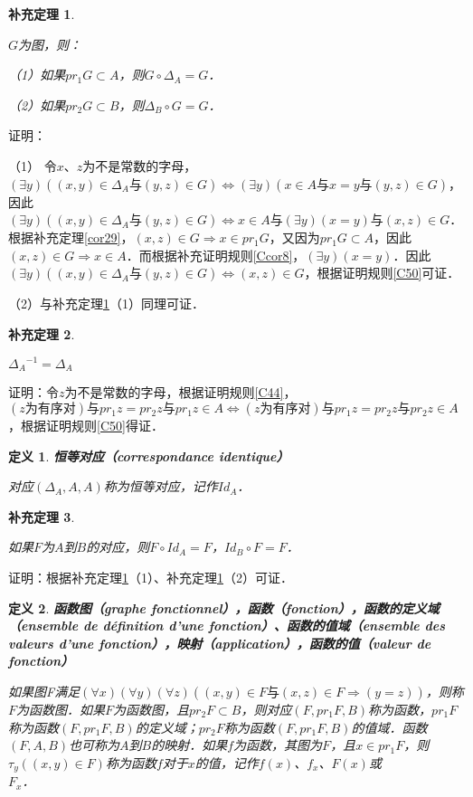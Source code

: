 \documentclass[12pt, a4paper, oneside]{book}
\newtheorem{cor}{补充定理}
\newtheorem{de}{定义}
\begin{document}
			\begin{cor}\label{cor60}
				\hfill\par
				$G$为图，则：
				\par
				（1）如果$pr_1G\subset A$，则$G\circ \Delta_A=G$．
				\par
				（2）如果$pr_2G\subset B$，则$\Delta_B\circ G=G$．
			\end{cor}
			证明：
			\par
			（1）	令$x$、$z$为不是常数的字母，$(\exists y)((x, y)\in \Delta_A\text{与}(y, z)\in G)\Leftrightarrow (\exists y)(x\in A\text{与}x=y\text{与}(y, z)\in G)$，因此$(\exists y)((x, y)\in \Delta_A\text{与}(y, z)\in G)\Leftrightarrow x\in A\text{与}(\exists y)(x=y)\text{与}(x, z)\in G$．根据补充定理\ref{cor29}，$(x, z)\in G\Rightarrow x\in pr_1G$，又因为$pr_1G\subset A$，因此$(x, z)\in G\Rightarrow x\in A$．而根据补充证明规则\ref{Ccor8}，$(\exists y)(x=y)$．因此$(\exists y)((x, y)\in \Delta_A\text{与}(y, z)\in G)\Leftrightarrow (x, z)\in G$，根据证明规则\ref{C50}可证．
			\par
			（2）与补充定理\ref{cor60}（1）同理可证．
			
			\begin{cor}\label{cor61}
				\hfill\par
				${\Delta_A}^{-1}=\Delta_A$
			\end{cor}
			证明：令$z$为不是常数的字母，根据证明规则\ref{C44}，$(z\text{为有序对})\text{与}pr_1z=pr_2z\text{与}pr_1z\in A\Leftrightarrow (z\text{为有序对})\text{与}pr_1z=pr_2z\text{与}pr_2z\in A$，根据证明规则\ref{C50}得证．

			\begin{de}
				\textbf{恒等对应（correspondance identique）}
				\par
				对应$(\Delta_A, A, A)$称为恒等对应，记作$Id_A$．
			\end{de}
			
			\begin{cor}\label{cor62}
				\hfill\par
				如果$F$为$A$到$B$的对应，则$F\circ Id_A=F$，$Id_B\circ F=F$．
			\end{cor}
			证明：根据补充定理\ref{cor60}（1）、补充定理\ref{cor60}（2）可证．

			\begin{de}
				\textbf{函数图（graphe fonctionnel），函数（fonction），函数的定义域（ensemble de définition d'une fonction）、函数的值域（ensemble des valeurs d'une fonction），映射（application），函数的值（valeur de fonction）}
				\par
				如果图F满足$(\forall x)(\forall y)(\forall z)((x, y)\in F\text{与}(x, z)\in F\Rightarrow (y=z))$，则称$F$为函数图．如果$F$为函数图，且$pr_2F\subset B$，则对应$(F, pr_1F, B)$称为函数，$pr_1F$称为函数$(F, pr_1F, B)$的定义域；$pr_2F$称为函数$(F, pr_1F, B)$的值域．函数$(F, A, B)$也可称为$A$到$B$的映射．如果$f$为函数，其图为$F$，且$x\in pr_1F$，则$\tau_y((x, y)\in F)$称为函数$f$对于$x$的值，记作$f(x)$、$f_x$、$F(x)$或\\$F_x$．
			\end{de}
\end{document}
